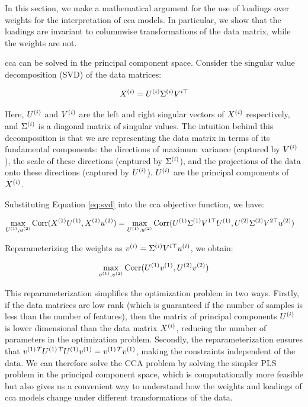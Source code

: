 In this section, we make a mathematical argument for the use of \gls{loadings} over weights for the interpretation of \acrshort{cca} models.
In particular, we show that the \gls{loadings} are invariant to columnwise transformations of the data matrix, while the weights are not.

\acrshort{cca} can be solved in the principal component space.
Consider the singular value decomposition (SVD) of the data matrices:

\begin{align}
    X^{(i)} = U^{(i)}\Sigma^{(i)}V^{i\top} \label{eq:svd}
\end{align}

Here, $U^{(i)}$ and $V^{(i)}$ are the left and right singular vectors of $X^{(i)}$ respectively, and $\Sigma^{(i)}$ is a diagonal matrix of singular values.
The intuition behind this decomposition is that we are representing the data matrix in terms of its fundamental components: the directions of maximum variance (captured by $V^{(i)}$), the scale of these directions (captured by $\Sigma^{(i)}$), and the projections of the data onto these directions (captured by $U^{(i)}$).
$U^{(i)}$ are the principal components of $X^{(i)}$.

Substituting Equation \ref{eq:svd} into the \acrshort{cca} objective function, we have:

\begin{align}
    \max_{U^{(1)}, u^{(2)}} \operatorname{Corr}(X^{(1)}U^{(1)}, X^{(2)}u^{(2)}) &= \max_{U^{(1)}, u^{(2)}} \operatorname{Corr}(U^{(1)}\Sigma^{(1)}V^{1\top}U^{(1)}, U^{(2)}\Sigma^{(2)}V^{2\top}u^{(2)}) \label{eq:cca_obj}
\end{align}

Reparameterizing the weights as $v^{(i)} = \Sigma^{(i)}V^{i\top}u^{(i)}$, we obtain:

\begin{align}
    \max_{v^{(1)}, v^{(2)}} \operatorname{Corr}(U^{(1)}v^{(1)}, U^{(2)}v^{(2)}) \label{eq:reparam}
\end{align}

This reparameterization simplifies the optimization problem in two ways.
Firstly, if the data matrices are low rank (which is guaranteed if the number of samples is less than the number of features), then the matrix of principal components $U^{(i)}$ is lower dimensional than the data matrix $X^{(i)}$, reducing the number of parameters in the optimization problem.
Secondly, the reparameterization ensures that $v^{(1)\,T}U^{(1)\,T}U^{(1)}v^{(1)}=v^{(1)\,T}v^{(1)}$, making the constraints independent of the data.
We can therefore solve the CCA problem by solving the simpler PLS problem in the principal component space, which is computationally more feasible but also gives us a convenient way to understand how the weights and \gls{loadings} of \acrshort{cca} models change under different transformations of the data.

